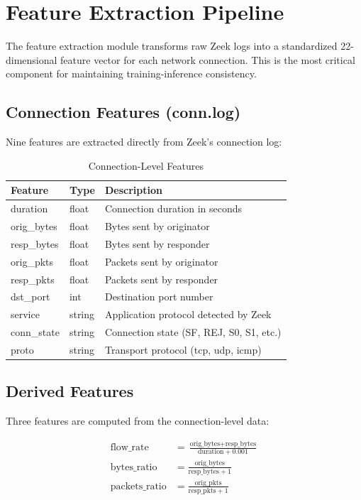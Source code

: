 \documentclass[12pt,a4paper,twoside]{report}
\begin{document}
\section{Feature Extraction Pipeline}

The feature extraction module transforms raw Zeek logs into a standardized 22-dimensional feature vector for each network connection. This is the most critical component for maintaining training-inference consistency.

\subsection{Connection Features (conn.log)}

Nine features are extracted directly from Zeek's connection log:

\begin{table}[H]
\centering
\caption{Connection-Level Features}
\begin{tabularx}{\textwidth}{llX}
\toprule
\textbf{Feature} & \textbf{Type} & \textbf{Description} \\
\midrule
duration & float & Connection duration in seconds \\
orig\_bytes & float & Bytes sent by originator \\
resp\_bytes & float & Bytes sent by responder \\
orig\_pkts & float & Packets sent by originator \\
resp\_pkts & float & Packets sent by responder \\
dst\_port & int & Destination port number \\
service & string & Application protocol detected by Zeek \\
conn\_state & string & Connection state (SF, REJ, S0, S1, etc.) \\
proto & string & Transport protocol (tcp, udp, icmp) \\
\bottomrule
\end{tabularx}
\end{table}

\subsection{Derived Features}

Three features are computed from the connection-level data:

\begin{align}
\text{flow\_rate} &= \frac{\text{orig\_bytes} + \text{resp\_bytes}}{\text{duration} + 0.001} \\
\text{bytes\_ratio} &= \frac{\text{orig\_bytes}}{\text{resp\_bytes} + 1} \\
\text{packets\_ratio} &= \frac{\text{orig\_pkts}}{\text{resp\_pkts} + 1}
\end{align}
\end{document}
